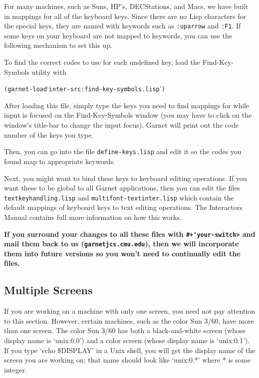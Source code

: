 \documentclass{report}
\newenvironment{programexample}{\begin{alltt}}{\end{alltt}}
\begin{document}
For many machines, such as Suns, HP's, DECStations, and Macs, we have
built in mappings for all of the keyboard keys.  Since there are no
Lisp characters for the special keys, they are named with keywords
such as \texttt{:uparrow} and \texttt{:F1}.  If some keys on your keyboard are
not mapped to keywords, you can use the following mechanism to set
this up.

  To find the correct codes
to use for each undefined key, load the Find-Key-Symbols utility with
\begin{programexample}
  (garnet-load `inter-src:find-key-symbols.lisp')
\end{programexample}
After loading this file, simply type the keys you need to find
mappings for while input is focused on the Find-Key-Symbols window
(you may have to click on the window's title-bar to change the input
focus).  Garnet will print out the code number of the keys you type.

Then, you can go into the file \texttt{define-keys.lisp} and edit it so
the codes you found map to appropriate keywords.

Next, you might want to bind these keys to keyboard editing
operations.  If you want these to be global to all Garnet
applications, then you can edit the files 
\texttt{textkeyhandling.lisp} and
\texttt{multifont-textinter.lisp} which contain the default
mappings of keyboard keys to text editing operations.  The Interactors
Manual contains full more information on how this works.

{\bf If you surround your changes to all these files with
  \texttt{\#+{\tt\char`\<}your-switch>} and mail them back to us
  (\texttt{garnetjcs.cmu.edu}), then we will incorporate them into future
  versions so you won't need to continually edit the files.}

\subsection{Multiple Screens}
  
If you are working on a machine with only one screen, you need not pay
attention to this section.  However, certain machines, such as the
color Sun 3/60, have more than one screen.  The color Sun 3/60 has
both a black-and-white screen (whose display name is `unix:0.0') and a
color screen (whose display name is `unix:0.1').  If you type `echo
\$DISPLAY' in a Unix shell, you will get the display name of the
screen you are working on; that name should look like `unix:0.*' where
* is some integer.
\end{document}
